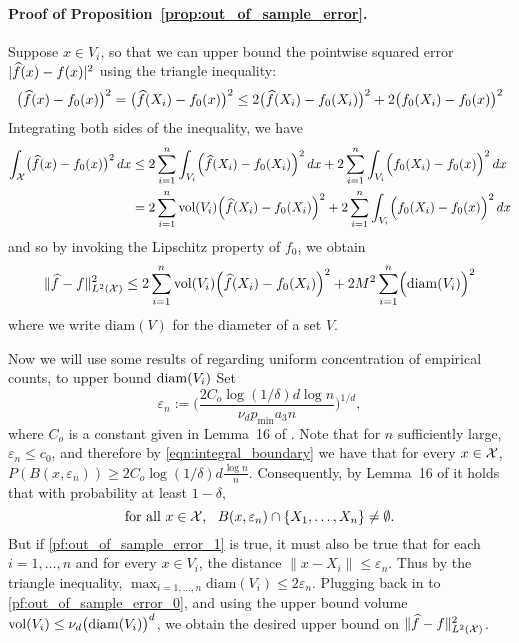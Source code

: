 \paragraph{Proof of Proposition~\ref{prop:out_of_sample_error}.}
Suppose $x \in V_i$, so that we can upper bound the pointwise squared error $|\widehat{f}(x) - f(x)|^2$ using the triangle inequality:
\begin{equation*}
\bigl(\widehat{f}(x) - f_0(x)\bigr)^2 = \bigl(\widehat{f}(X_i) - f_0(x)\bigr)^2 \leq 2\bigl(\widehat{f}(X_i) - f_0(X_i)\bigr)^2 + 2\bigl(f_0(X_i) - f_0(x)\bigr)^2
\end{equation*}
Integrating both sides of the inequality, we have
\begin{align*}
\int_{\mathcal{X}} \bigl(\widehat{f}(x) - f_0(x)\bigr)^2 \,dx & \leq 2  \sum_{i = 1}^{n} \int_{V_i} \Bigl(\widehat{f}(X_i) - f_0(X_i)\Bigr)^2 \,dx + 2 \sum_{i = 1}^{n} \int_{V_i} \Bigl(f_0(X_i) - f_0(x)\Bigr)^2 \,dx \\
& = 2 \sum_{i = 1}^{n} \text{vol}(V_i) \Bigl(\widehat{f}(X_i) - f_0(X_i)\Bigr)^2 + 2 \sum_{i = 1}^{n} \int_{V_i} \Bigl(f_0(X_i) - f_0(x)\Bigr)^2 \,dx
\end{align*}
and so by invoking the Lipschitz property of $f_0$, we obtain
\begin{equation}
\label{pf:out_of_sample_error_0}
\|\widehat{f} - f\|_{L^2(\mathcal{X})}^2 \leq 2 \sum_{i = 1}^{n} \text{vol}(V_i) \Bigl(\widehat{f}(X_i) - f_0(X_i)\Bigr)^2 + 2 M^2 \sum_{i = 1}^{n} \Bigl(\mathrm{diam}(V_i)\Bigr)^2
\end{equation}
where we write $\mathrm{diam}(V)$ for the diameter of a set $V$. 

Now we will use some results of \citet{chaudhuri2010} regarding uniform concentration of empirical counts, to upper bound $\mathrm{diam}(V_i)$ Set
\begin{equation*}
\varepsilon_n := \biggl(\frac{2C_{o}\log(1/\delta)d\log n}{\nu_dp_{\min}a_3n}\biggr)^{1/d},
\end{equation*}
where $C_{o}$ is a constant given in Lemma~16 of \citet{chaudhuri2010}. Note that for $n$ sufficiently large, $\varepsilon_n \leq c_0$, and therefore by \eqref{eqn:integral_boundary} we have that for every $x \in \mathcal{X}$, $P(B(x,\varepsilon_n)) \geq 2C_{o}\log(1/\delta)d\frac{\log n}{n}$. Consequently, by Lemma~16 of \citet{chaudhuri2010} it holds that with probability at least $1 - \delta$,
\begin{equation}
\label{pf:out_of_sample_error_1}
\textrm{for all $x \in \mathcal{X}$},~~ B(x,\varepsilon_n) \cap \{X_1,\ldots,X_n\} \neq \emptyset.
\end{equation}
But if \eqref{pf:out_of_sample_error_1} is true, it must also be true that for each $i = 1,\ldots,n$ and for every $x \in V_i$, the distance $\|x - X_i\| \leq \varepsilon_n$. Thus by the triangle inequality, $\max_{i = 1,\ldots,n} \mathrm{diam}(V_i) \leq 2\varepsilon_n$. Plugging back in to \eqref{pf:out_of_sample_error_0}, and using the upper bound volume $\text{vol}(V_i) \leq \nu_d \bigl(\mathrm{diam}(V_i)\bigr)^d$, we obtain the desired upper bound on $\|\widehat{f} - f\|_{L^2(\mathcal{X})}^2$.

